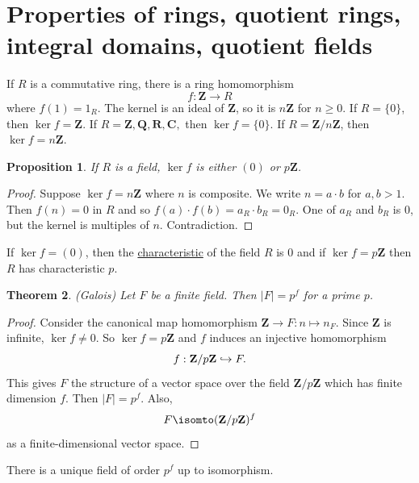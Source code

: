 \documentclass[11pt, oneside]{amsart}
\numberwithin{equation}{section}
\newtheorem{theorem}{Theorem}
\numberwithin{theorem}{section}
\newtheorem{proposition}[theorem]{Proposition}
\theoremstyle{definition}
\let\bar\relax
\def\Z{\mathbf{Z}}
\def\R{\mathbf{R}}
\def\Q{\mathbf{Q}}
\def\C{\mathbf{C}}
\begin{document}
{\section{Properties of rings, quotient rings, integral domains, quotient fields}
If $R $ is a commutative ring, there is a ring homomorphism
$$
f : \Z\to R
$$
where $f(1) = 1_R$. The kernel is an ideal of $\Z$, so it is $n\Z$ for $n\geqslant 0$. If $R=\{0\}$, then $\ker f = \Z$. If $R= \Z,\Q,\R,\C,$ then $\ker f = \{0\}$. If $R=\Z/n\Z$, then $\ker f = n\Z$.
\begin{proposition}
If $R$ is a field, $\ker f$ is either $(0)$ or $p\Z$.
\end{proposition}
\begin{proof}
Suppose $\ker f = n\Z$ where $n$ is composite. We write $n = a\cdot b$ for $a,b>1$. Then $f(n)= 0$ in $R$ and so $f(a)\cdot f(b) = a_R \cdot b_R = 0_R$. One of $a_R$ and $b_R$ is $0$, but the kernel is multiples of $n$. Contradiction. 
\end{proof}
If $\ker f = (0)$, then the \underline{characteristic} of the field $R$ is $0$ and if $\ker f = p\Z$ then $R$ has characteristic $p$.
\begin{theorem}
(Galois) Let $F$ be a finite field. Then $|F| = p^f$ for a prime $p$.
\end{theorem}
\begin{proof}
Consider the canonical map homomorphism $\Z\to F:n\mapsto n_F$. Since $\Z$ is infinite, $\ker f\neq 0$. So $\ker f = p\Z$ and $f$ induces an injective homomorphism 
$$
\bar f : \Z/p\Z \hookrightarrow F.
$$
This gives $F$ the structure of a vector space over the field $\Z/p\Z$ which has finite dimension $f$. Then $|F| = p^f$. Also, 
$$
F \isomto (\Z/p\Z)^f
$$
as a finite-dimensional vector space.
\end{proof}
There is a unique field of order $p^f$ up to isomorphism.

}
\end{document}
